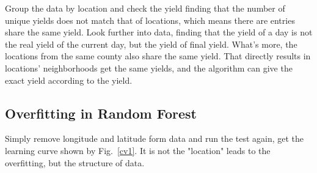 \documentclass[conference, a4paper]{IEEEtran}
\begin{document}
  Group the data by location and check the yield finding that the number of unique yields does not match that of locations, which means there are entries share the same yield. Look further into data, finding that the yield of a day is not the real yield of the current day, but the yield of final yield. What's more, the locations from the same county also share the same yield. That directly results in locations' neighborhoods get the same yields, and the algorithm can give the exact yield according to the yield.  

\subsection{Overfitting in Random Forest}
  Simply remove longitude and latitude form data and run the test again, get the learning curve shown by Fig.~\ref{cv1}. It is not the "location" leads to the overfitting, but the structure of data.
\end{document}
